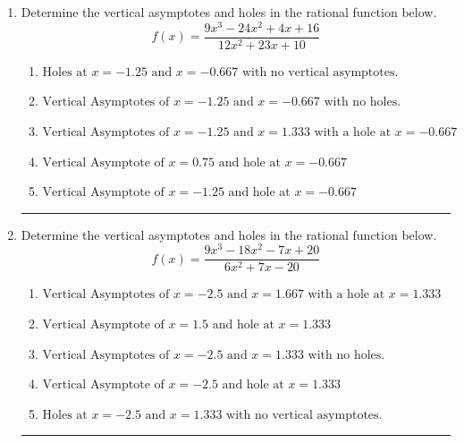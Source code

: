 \documentclass[14pt]{extbook}
\newcommand{\litem}[1]{\item#1\hspace*{-1cm}\rule{\textwidth}{0.4pt}}
\begin{document}
\begin{enumerate}
{\begin{enumerate}[label=\Alph*.]
\end{enumerate} }
\litem{
Determine the vertical asymptotes and holes in the rational function below.\[ f(x) = \frac{9x^{3} -24 x^{2} +4 x + 16}{12x^{2} +23 x + 10} \]\begin{enumerate}[label=\Alph*.]
\item \( \text{Holes at } x = -1.25 \text{ and } x = -0.667 \text{ with no vertical asymptotes.} \)
\item \( \text{Vertical Asymptotes of } x = -1.25 \text{ and } x = -0.667 \text{ with no holes.} \)
\item \( \text{Vertical Asymptotes of } x = -1.25 \text{ and } x = 1.333 \text{ with a hole at } x = -0.667 \)
\item \( \text{Vertical Asymptote of } x = 0.75 \text{ and hole at } x = -0.667 \)
\item \( \text{Vertical Asymptote of } x = -1.25 \text{ and hole at } x = -0.667 \)

\end{enumerate} }
\litem{
Determine the vertical asymptotes and holes in the rational function below.\[ f(x) = \frac{9x^{3} -18 x^{2} -7 x + 20}{6x^{2} +7 x -20} \]\begin{enumerate}[label=\Alph*.]
\item \( \text{Vertical Asymptotes of } x = -2.5 \text{ and } x = 1.667 \text{ with a hole at } x = 1.333 \)
\item \( \text{Vertical Asymptote of } x = 1.5 \text{ and hole at } x = 1.333 \)
\item \( \text{Vertical Asymptotes of } x = -2.5 \text{ and } x = 1.333 \text{ with no holes.} \)
\item \( \text{Vertical Asymptote of } x = -2.5 \text{ and hole at } x = 1.333 \)
\item \( \text{Holes at } x = -2.5 \text{ and } x = 1.333 \text{ with no vertical asymptotes.} \)

\end{enumerate} }
\end{enumerate}
\end{document}
